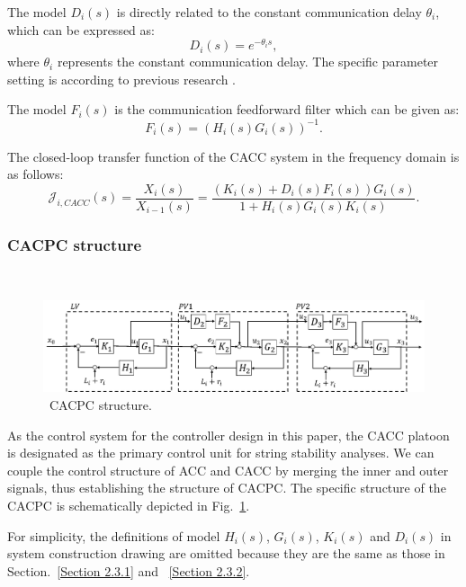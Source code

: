\documentclass[journal]{IEEEtran}
\begin{document}
The model $D_i(s)$ is directly related to the constant communication delay $\theta_i$, which can be expressed as:
\begin{equation}
  D_{i}(s)=e^{-\theta_{i} s},
\end{equation}
where $\theta_i$ represents the constant communication delay. The specific parameter setting is according to previous research \citep{navas2016using,zhang2020control}.

The model $F_i(s)$ is the communication feedforward filter which can be given as:
\begin{equation}
  F_{i}(s)=\left(H_{i}(s) G_{i}(s)\right)^{-1}.
\end{equation}

The closed-loop transfer function of the CACC system in the frequency domain is as follows:
\begin{equation}
  \mathcal{J}_{i, C A C C}(s)=\frac{X_{i}(s)}{X_{i-1}(s)}=\frac{\left(K_{i}(s)+D_{i}(s) F_{i}(s)\right) G_{i}(s)}{1+H_{i}(s) G_{i}(s) K_{i}(s)}.
\end{equation}

\subsubsection{CACPC structure}
\label{Section 2.3.3}
~\\
\begin{figure}
  \centering
  \includegraphics[width=14cm]{figs/fig3.png}
  \caption{~CACPC structure.}
  \label{fig3}
\end{figure}

As the control system for the controller design in this paper, the CACC platoon is designated as the primary control unit for string stability analyses. We can couple the control structure of ACC and CACC by merging the inner and outer signals, thus establishing the structure of CACPC. The specific structure of the CACPC is schematically depicted in Fig.~\ref{fig3}.

For simplicity, the definitions of model $H_i(s)$, $G_i(s)$, $K_i(s)$ and $D_i(s)$ in system construction drawing are omitted because they are the same as those in Section.~\ref{Section 2.3.1} and ~\ref{Section 2.3.2}.
\end{document}
